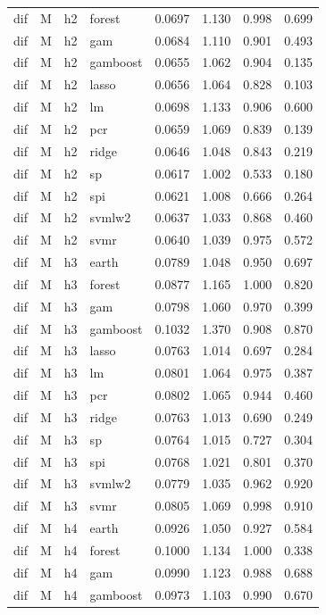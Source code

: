 \begin{ThreePartTable}
\begin{longtable}[t]{llclcccc}
dif & M & h2 & forest & 0.0697 & 1.130 & 0.998 & 0.699\\
dif & M & h2 & gam & 0.0684 & 1.110 & 0.901 & 0.493\\
dif & M & h2 & gamboost & 0.0655 & 1.062 & 0.904 & 0.135\\
dif & M & h2 & lasso & 0.0656 & 1.064 & 0.828 & 0.103\\
dif & M & h2 & lm & 0.0698 & 1.133 & 0.906 & 0.600\\
dif & M & h2 & pcr & 0.0659 & 1.069 & 0.839 & 0.139\\
dif & M & h2 & ridge & 0.0646 & 1.048 & 0.843 & 0.219\\
dif & M & h2 & sp & 0.0617 & 1.002 & 0.533 & 0.180\\
dif & M & h2 & spi & 0.0621 & 1.008 & 0.666 & 0.264\\
dif & M & h2 & svmlw2 & 0.0637 & 1.033 & 0.868 & 0.460\\
dif & M & h2 & svmr & 0.0640 & 1.039 & 0.975 & 0.572\\
\addlinespace
dif & M & h3 & earth & 0.0789 & 1.048 & 0.950 & 0.697\\
dif & M & h3 & forest & 0.0877 & 1.165 & 1.000 & 0.820\\
dif & M & h3 & gam & 0.0798 & 1.060 & 0.970 & 0.399\\
dif & M & h3 & gamboost & 0.1032 & 1.370 & 0.908 & 0.870\\
dif & M & h3 & lasso & 0.0763 & 1.014 & 0.697 & 0.284\\
dif & M & h3 & lm & 0.0801 & 1.064 & 0.975 & 0.387\\
dif & M & h3 & pcr & 0.0802 & 1.065 & 0.944 & 0.460\\
dif & M & h3 & ridge & 0.0763 & 1.013 & 0.690 & 0.249\\
dif & M & h3 & sp & 0.0764 & 1.015 & 0.727 & 0.304\\
dif & M & h3 & spi & 0.0768 & 1.021 & 0.801 & 0.370\\
dif & M & h3 & svmlw2 & 0.0779 & 1.035 & 0.962 & 0.920\\
dif & M & h3 & svmr & 0.0805 & 1.069 & 0.998 & 0.910\\
\addlinespace
dif & M & h4 & earth & 0.0926 & 1.050 & 0.927 & 0.584\\
dif & M & h4 & forest & 0.1000 & 1.134 & 1.000 & 0.338\\
dif & M & h4 & gam & 0.0990 & 1.123 & 0.988 & 0.688\\
dif & M & h4 & gamboost & 0.0973 & 1.103 & 0.990 & 0.670\\

\end{longtable}
\end{ThreePartTable}
